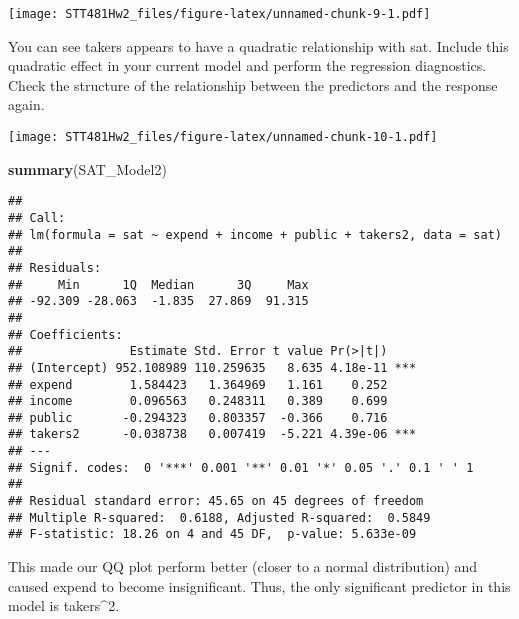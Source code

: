 \documentclass[]{article}
\newenvironment{Shaded}{\begin{snugshade}}{\end{snugshade}}
\newcommand{\KeywordTok}[1]{\textcolor[rgb]{0.13,0.29,0.53}{\textbf{#1}}}
\newcommand{\DataTypeTok}[1]{\textcolor[rgb]{0.13,0.29,0.53}{#1}}
\newcommand{\DecValTok}[1]{\textcolor[rgb]{0.00,0.00,0.81}{#1}}
\newcommand{\StringTok}[1]{\textcolor[rgb]{0.31,0.60,0.02}{#1}}
\newcommand{\OperatorTok}[1]{\textcolor[rgb]{0.81,0.36,0.00}{\textbf{#1}}}
\newcommand{\NormalTok}[1]{#1}
\begin{document}
\texttt{[image: STT481Hw2\_files/figure-latex/unnamed-chunk-9-1.pdf]}

You can see takers appears to have a quadratic relationship with sat.
Include this quadratic effect in your current model and perform the
regression diagnostics. Check the structure of the relationship between
the predictors and the response again.

\begin{Shaded}
\end{Shaded}

\texttt{[image: STT481Hw2\_files/figure-latex/unnamed-chunk-10-1.pdf]}

\begin{Shaded}
\begin{Highlighting}[]
\KeywordTok{summary}\NormalTok{(SAT_Model2)}
\end{Highlighting}
\end{Shaded}

\begin{verbatim}
## 
## Call:
## lm(formula = sat ~ expend + income + public + takers2, data = sat)
## 
## Residuals:
##     Min      1Q  Median      3Q     Max 
## -92.309 -28.063  -1.835  27.869  91.315 
## 
## Coefficients:
##               Estimate Std. Error t value Pr(>|t|)    
## (Intercept) 952.108989 110.259635   8.635 4.18e-11 ***
## expend        1.584423   1.364969   1.161    0.252    
## income        0.096563   0.248311   0.389    0.699    
## public       -0.294323   0.803357  -0.366    0.716    
## takers2      -0.038738   0.007419  -5.221 4.39e-06 ***
## ---
## Signif. codes:  0 '***' 0.001 '**' 0.01 '*' 0.05 '.' 0.1 ' ' 1
## 
## Residual standard error: 45.65 on 45 degrees of freedom
## Multiple R-squared:  0.6188, Adjusted R-squared:  0.5849 
## F-statistic: 18.26 on 4 and 45 DF,  p-value: 5.633e-09
\end{verbatim}

This made our QQ plot perform better (closer to a normal distribution)
and caused expend to become insignificant. Thus, the only significant
predictor in this model is takers\^{}2.
\end{document}
